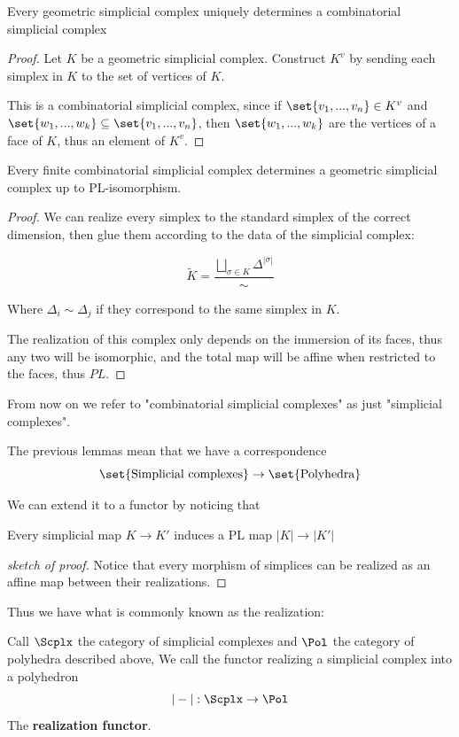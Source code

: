 \begin{lemma} Every geometric simplicial complex uniquely determines a combinatorial simplicial complex
\end{lemma}
\begin{proof}

    Let $K$ be a geometric simplicial complex. Construct $K^v$ by sending each simplex in $K$ to the set of vertices of $K$.
    
    This is a combinatorial simplicial complex, since if $\set{v_1,...,v_n}\in K^v$ and $\set{w_1,...,w_k}\subseteq \set{v_1,...,v_n}$, then 
    $\set{w_1,...,w_k}$ are the vertices of a face of $K$, thus an element of $K^v$.
\end{proof}

\begin{lemma} Every finite combinatorial simplicial complex determines a geometric simplicial complex up to PL-isomorphism.
\end{lemma}
\begin{proof}
    We can realize every simplex to the standard simplex of the correct dimension, then glue them according to the data of the simplicial complex:

    \[\tilde{K}=\dfrac{\bigsqcup_{\sigma\in K}\Delta^{|\sigma|}}{\sim}\]

    Where $\Delta_i\sim\Delta_j$ if they correspond to the same simplex in $K$.

    The realization of this complex only depends on the immersion of its faces, thus any two will be isomorphic, and the total map will be affine when restricted
    to the faces, thus $PL$.
\end{proof}

From now on we refer to "combinatorial simplicial complexes" as just "simplicial complexes".

The previous lemmas mean that we have a correspondence
\[\set{\text{Simplicial complexes}}\rightarrow \set{\text{Polyhedra}}\]

We can extend it to a functor by noticing that 
\begin{lemma}
    Every simplicial map $K\to K'$ induces a PL map $|K|\to|K'|$
\end{lemma}
\begin{proof}[sketch of proof]
    Notice that every morphism of simplices can be realized as an affine map between their realizations.
\end{proof}

Thus we have what is commonly known as the realization:
\begin{definition}
    Call $\Scplx$ the category of simplicial complexes and $\Pol$ the category of polyhedra described above,
    We call the functor realizing a simplicial complex into a polyhedron 
    \[|-|:\Scplx\to\Pol\]
    The \textbf{realization functor}.
\end{definition}

